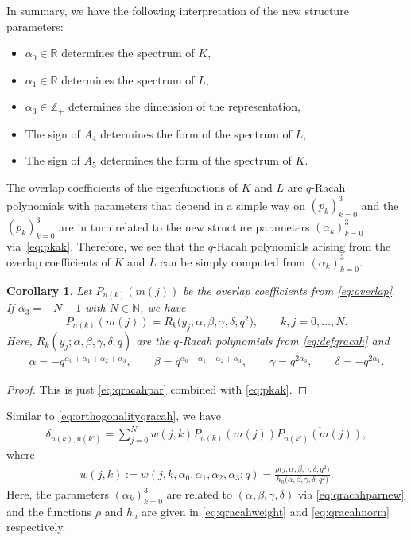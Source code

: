 \documentclass[10pt,a4paper]{amsart}
\numberwithin{equation}{section}
\newtheorem{Corollary}[Theorem]{Corollary}
\newcommand{\RR}{\mathbb{R}}
\newcommand{\ZZ}{\mathbb{Z}}
\newcommand{\NN}{\mathbb{N}}
\begin{document}
In summary, we have the following interpretation of the new structure parameters:
\begin{itemize}\itemsep=0pt
	\item $\alpha_0\in\RR$ determines the spectrum of $K$,
	\item $\alpha_1\in\RR$ determines the spectrum of $L$,
	\item $\alpha_3\in\ZZ_+$ determines the dimension of the representation,
	\item The sign of $A_4$ determines the form of the spectrum of $L$,
	\item The sign of $A_5$ determines the form of the spectrum of $K$.
\end{itemize}
The overlap coefficients of the eigenfunctions of $K$ and $L$ are $q$-Racah polynomials with parameters that depend in a simple way on $(p_k)_{k=0}^3$ and the $(p_k)_{k=0}^3$ are in turn related to the new structure parameters $(\alpha_k)_{k=0}^3$ via~\eqref{eq:pkak}. Therefore, we see that the $q$-Racah polynomials arising from the overlap coefficients of $K$ and $L$ can be simply computed from $(\alpha_k)_{k=0}^3$.
\begin{Corollary}
	Let $P_{n(k)}(m(j))$ be the overlap coefficients from \eqref{eq:overlap}. If $\alpha_3=-N-1$ with $N\in\NN$, we have
\[
P_{n(k)}(m(j))=R_k\big(y_j;\alpha,\beta,\gamma,\delta;q^2\big),\qquad k,j=0,\dots,N.
\]
	Here, $R_k(y_j;\alpha,\beta,\gamma,\delta;q)$ are the $q$-Racah polynomials from \eqref{eq:defqracah} and
\begin{gather}
\alpha=-q^{\alpha_0+\alpha_1+\alpha_2+\alpha_3},\qquad \beta=q^{\alpha_0-\alpha_1-\alpha_2+\alpha_3},\qquad \gamma=q^{2\alpha_3},\qquad \delta=-q^{2\alpha_1}. \label{eq:qracahparnew}
\end{gather}
\end{Corollary}
\begin{proof}
This is just \eqref{eq:qracahpar} combined with \eqref{eq:pkak}.
\end{proof}

Similar to \eqref{eq:orthogonalityqracah}, we have
\begin{gather*}
	\delta_{n(k),n(k')}=\sum_{j=0}^N w(j,k)P_{n(k)}(m(j))\overline{P_{n(k')}(m(j))},
\end{gather*}
where
\begin{gather}
w(j,k):=w(j,k,\alpha_0,\alpha_1,\alpha_2,\alpha_3;q) =\frac{\rho\big(j,\alpha,\beta,\gamma,\delta;q^2\big)}{h_n\big(\alpha,\beta,\gamma,\delta:q^2\big)}.\label{eq:weightqracahnew}
\end{gather}
Here, the parameters $(\alpha_k)_{k=0}^3$ are related to $(\alpha,\beta,\gamma,\delta)$ via \eqref{eq:qracahparnew} and the functions $\rho$ and $h_n$ are given in \eqref{eq:qracahweight} and \eqref{eq:qracahnorm} respectively.
\end{document}
